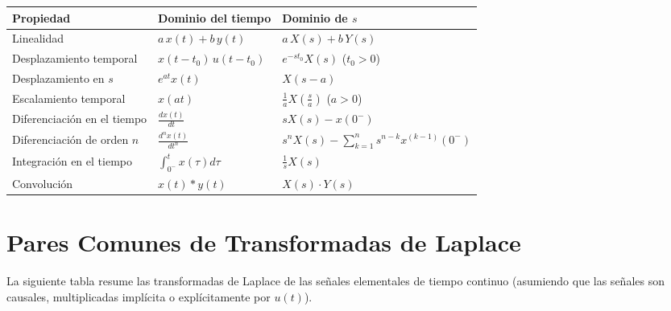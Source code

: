 \documentclass[11pt,a4paper,openany]{book}
\begin{document}
\renewcommand{\arraystretch}{1.8} %
\begin{center}
	\begin{tabular}{p{4.5cm} p{4cm} p{4.5cm}}
		\hline
		\textbf{Propiedad} & \textbf{Dominio del tiempo} & \textbf{Dominio de $s$} \\
		\hline
		Linealidad & $a \, x(t) + b \, y(t)$ & $a \, X(s) + b \, Y(s)$ \\
		Desplazamiento temporal & $x(t-t_0) \, u(t-t_0)$ & $e^{-st_0} X(s)$ \quad ($t_0 > 0$) \\
		Desplazamiento en $s$ & $e^{at} x(t)$ & $X(s-a)$ \\
		Escalamiento temporal & $x(at)$ & $\frac{1}{a} X\left(\frac{s}{a}\right)$ \quad ($a > 0$) \\
		Diferenciación en el tiempo & $\frac{dx(t)}{dt}$ & $s X(s) - x(0^{-})$ \\
		Diferenciación de orden $n$ & $\frac{d^n x(t)}{dt^n}$ & $s^n X(s) - \sum_{k=1}^{n} s^{n-k} x^{(k-1)}(0^{-})$ \\
		Integración en el tiempo & $\int_{0^{-}}^{t} x(\tau) d\tau$ & $\frac{1}{s} X(s)$ \\
		Convolución & $x(t) * y(t)$ & $X(s) \cdot Y(s)$ \\
		\hline
	\end{tabular}
\end{center}

\section{Pares Comunes de Transformadas de Laplace}

La siguiente tabla resume las transformadas de Laplace de las señales elementales de tiempo continuo (asumiendo que las señales son causales, multiplicadas implícita o explícitamente por $u(t)$).
\end{document}
